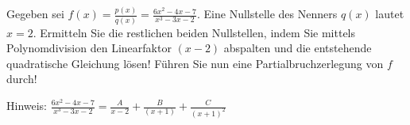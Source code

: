 \item Gegeben sei $f(x) = \frac{p(x)}{q(x)} = \frac{6x^2-4x-7}{x^3-3x-2}$. Eine Nullstelle des Nenners $q(x)$ lautet $x=2$. Ermitteln Sie die restlichen beiden Nullstellen, indem Sie mittels Polynomdivision den Linearfaktor $(x-2)$ abspalten und die entstehende quadratische Gleichung lösen! Führen Sie nun eine Partialbruchzerlegung von $f$ durch!

Hinweis: $\frac{6x^2-4x-7}{x^3-3x-2} = \frac{A}{x-2}+\frac{B}{(x+1)}+\frac{C}{(x+1)^2}$

